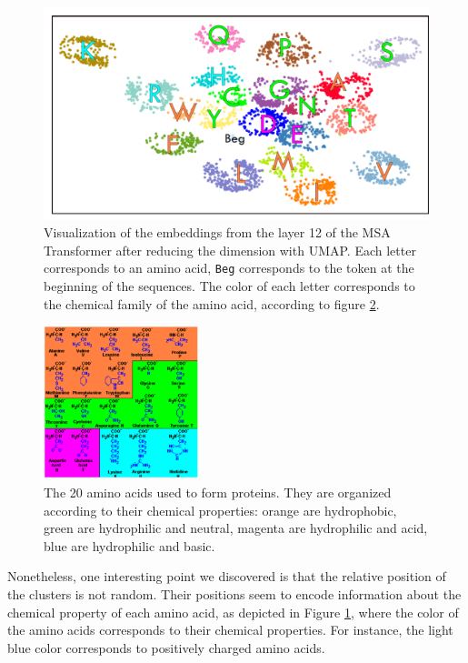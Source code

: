 \documentclass[11pt,a4paper]{article}
\begin{document}
\begin{figure}[ht]
\centering
\includegraphics[width=\textwidth]{images/layer_12_umap.png}
\caption{Visualization of the embeddings from the layer 12 of the MSA Transformer after reducing the dimension with UMAP. Each letter corresponds to an amino acid, \texttt{Beg} corresponds to the token at the beginning of the sequences. The color of each letter corresponds to the chemical family of the amino acid, according to figure \ref{fig_amino_acid_families}. }
\label{fig_umap_lay12}
\end{figure}

\begin{figure}[ht]
\centering
\includegraphics[width=0.4\textwidth]{images/ac_families.png}
\caption{The 20 amino acids used to form proteins. They are organized according to their chemical properties: orange are hydrophobic, green are hydrophilic and neutral, magenta are hydrophilic and acid, blue are hydrophilic and basic. }%
\label{fig_amino_acid_families}
\end{figure}

Nonetheless, one interesting point we discovered is that the relative position of the clusters is not random. Their positions seem to encode information about the chemical property of each amino acid, as depicted in Figure \ref{fig_umap_lay12}, where the color of the amino acids corresponds to their chemical properties. For instance, the light blue color corresponds to positively charged amino acids.
\end{document}
